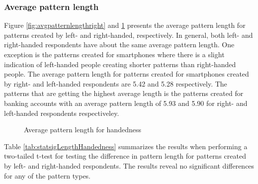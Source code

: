     \subsubsection{Average pattern length}
    Figure \ref{fig:avgpatternlengthright} and \ref{fig:avgpatternlengthhandedness} presents the average pattern length for patterns created by left- and right-handed, respectively. In general, both left- and right-handed respondents have about the same average pattern length. One exception is the patterns created for smartphones where there is a slight indication of left-handed people creating shorter patterns than right-handed people. The average pattern length for patterns created for smartphones created by right- and left-handed respondents are 5.42 and 5.28 respectively. The patterns that are getting the highest average length is the patterns created for banking accounts with an average pattern length of 5.93 and 5.90 for right- and left-handed respondents respectiveley. 

      \begin{figure}[H]
      	\centering
      	\caption{Average pattern length for handedness}
      	\label{fig:avgpatternlengthhandedness}
      \end{figure}

    Table \ref{tab:statsigLengthHandedness} summarizes the results when performing a two-tailed t-test for testing the difference in pattern length for patterns created by left- and right-handed respondents. The results reveal no significant differences for any of the pattern types.

